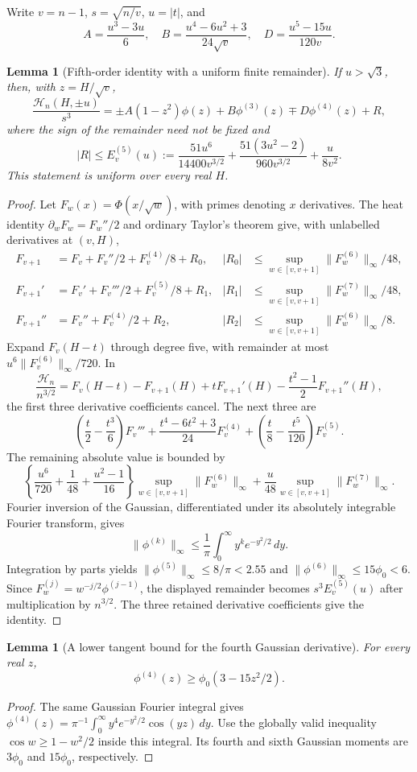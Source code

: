 \documentclass[11pt,a4paper]{article}
\numberwithin{equation}{section}
\newtheorem{lemma}[theorem]{Lemma}
\theoremstyle{definition}
\theoremstyle{remark}
\begin{document}
Write $v=n-1$, $s=\sqrt{n/v}$, $u=|t|$, and
\[
 A=\frac{u^3-3u}{6},\quad B=\frac{u^4-6u^2+3}{24\sqrt v},
 \quad D=\frac{u^5-15u}{120v}.
\]
\begin{lemma}[Fifth-order identity with a uniform finite remainder]
If $u>\sqrt3$, then, with $z=H/\sqrt v$,
\[
 \frac{\mathcal H_n(H,\pm u)}{s^3}
 =\pm A(1-z^2)\phi(z)+B\phi^{(3)}(z)
                  \mp D\phi^{(4)}(z)+R,
\]
where the sign of the remainder need not be fixed and
\[
 |R|\le E^{(5)}_v(u):=
 \frac{51u^6}{14400v^{3/2}}
 +\frac{51(3u^2-2)}{960v^{3/2}}+\frac{u}{8v^2}.
\]
This statement is uniform over every real $H$.
\end{lemma}
\begin{proof}
Let $F_w(x)=\Phi(x/\sqrt w)$, with primes denoting $x$ derivatives.
The heat identity $\partial_w F_w=F_w''/2$ and ordinary Taylor's theorem
give, with unlabelled derivatives at $(v,H)$,
\begin{align*}
 F_{v+1}&=F_v+F_v''/2+F_v^{(4)}/8+R_0,
 &|R_0|&\le\sup_{w\in[v,v+1]}\|F_w^{(6)}\|_\infty/48,\\
 F_{v+1}'&=F_v'+F_v'''/2+F_v^{(5)}/8+R_1,
 &|R_1|&\le\sup_{w\in[v,v+1]}\|F_w^{(7)}\|_\infty/48,\\
 F_{v+1}''&=F_v''+F_v^{(4)}/2+R_2,
 &|R_2|&\le\sup_{w\in[v,v+1]}\|F_w^{(6)}\|_\infty/8.
\end{align*}
Expand $F_v(H-t)$ through degree five, with remainder at most
$u^6\|F_v^{(6)}\|_\infty/720$. In
\[
 \frac{\mathcal H_n}{n^{3/2}}=
 F_v(H-t)-F_{v+1}(H)+tF_{v+1}'(H)
             -\frac{t^2-1}{2}F_{v+1}''(H),
\]
the first three derivative coefficients cancel. The next three are
\[
 \left(\frac t2-\frac{t^3}6\right)F_v'''
 +\frac{t^4-6t^2+3}{24}F_v^{(4)}
 +\left(\frac t8-\frac{t^5}{120}\right)F_v^{(5)}.
\]
The remaining absolute value is bounded by
\[
 \left\{\frac{u^6}{720}+\frac1{48}+\frac{u^2-1}{16}\right\}
       \sup_{w\in[v,v+1]}\|F_w^{(6)}\|_\infty
 +\frac u{48}\sup_{w\in[v,v+1]}\|F_w^{(7)}\|_\infty.
\]
Fourier inversion of the Gaussian, differentiated under its absolutely
integrable Fourier transform, gives
\[
 \|\phi^{(k)}\|_\infty
 \le\frac1\pi\int_0^\infty y^k e^{-y^2/2}\,dy.
\]
Integration by parts yields
$\|\phi^{(5)}\|_\infty\le8/\pi<2.55$ and
$\|\phi^{(6)}\|_\infty\le15\phi_0<6$.
Since $F_w^{(j)}=w^{-j/2}\phi^{(j-1)}$, the displayed remainder
becomes $s^3E^{(5)}_v(u)$ after multiplication by $n^{3/2}$.
The three retained derivative coefficients give the identity.
\end{proof}

\begin{lemma}[A lower tangent bound for the fourth Gaussian derivative]
For every real $z$,
\[
 \phi^{(4)}(z)\ge\phi_0(3-15z^2/2).
\]
\end{lemma}
\begin{proof}
The same Gaussian Fourier integral gives
$\phi^{(4)}(z)=\pi^{-1}\int_0^\infty
y^4e^{-y^2/2}\cos(yz)\,dy$.
Use the globally valid inequality $\cos w\ge1-w^2/2$ inside
this integral. Its fourth and sixth Gaussian moments are $3\phi_0$
and $15\phi_0$, respectively.
\end{proof}
\end{document}
